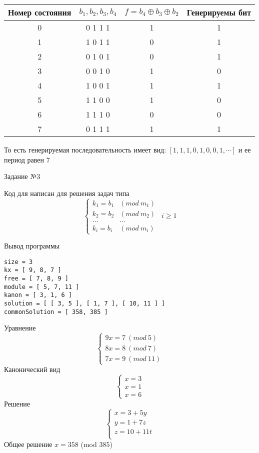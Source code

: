 \begin{table}[h]
  \begin{center}
    \begin{tabular}{|c|c|c|c|}
      \hline
      Номер состояния & $b_1, b_2, b_3, b_4$ & $f =  b_4 \oplus b_3 \oplus b_2$
      & Генерируемы бит\\
      \hline
       0 & 0 1 1 1 & 1 & 1 \\
       \hline
       1 & 1 0 1 1 & 0 & 1 \\
       \hline
       2 & 0 1 0 1 & 0 & 1 \\
       \hline
       3 & 0 0 1 0 & 1 & 0\\
       \hline
       4 & 1 0 0 1 & 1 & 1\\
       \hline
       5 & 1 1 0 0 & 1 & 0\\
       \hline
       6 & 1 1 1 0 & 0 & 0\\
       \hline
       7 & 0 1 1 1 & 1 & 1\\
       \hline
    \end{tabular}
  \end{center}
\end{table}
То есть генерируемая последовательность имеет вид: $[1, 1, 1, 0, 1, 0, 0, 1,
\cdots]$ и ее период равен 7\\

\begin{title}
  Задание №3
\end{title}

Код для написан для решения задач типа
$$
\left\{
\begin{array}{lc}
  k_1 = b_1 & (mod ~ m_1) \\
  k_2 = b_2 & (mod ~ m_2) \\
  \ldots & \ldots \\
  k_i = b_i & (mod ~ m_i)
\end{array}
\right. ~~ i \ge 1
$$



Вывод программы
\begin{lstlisting}
size = 3
kx = [ 9, 8, 7 ]
free = [ 7, 8, 9 ]
module = [ 5, 7, 11 ]
kanon = [ 3, 1, 6 ]
solution = [ [ 3, 5 ], [ 1, 7 ], [ 10, 11 ] ]
commonSolution = [ 358, 385 ]
\end{lstlisting}

Уравнение
$$
\left\{
\begin{array}{l}
  9x = 7 ~ (mod ~ 5)\\
  8x = 8 ~ (mod ~ 7)\\
  7x = 9 ~ (mod ~ 11)
\end{array}
\right.
$$
Канонический вид
$$
\left\{
\begin{array}{l}
  x = 3 \\
  x = 1 \\
  x = 6
\end{array}
\right.
$$
Решение
$$
\left\{
\begin{array}{l}
  x = 3 + 5y \\
  y = 1 + 7z \\
  z = 10 + 11t \\
\end{array}
\right.
$$
Общее решение $x = 358$ (mod $385$) \\


